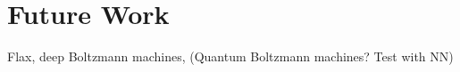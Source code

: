 \section{Future Work}\label{sec:Future}

Flax, deep Boltzmann machines, (Quantum Boltzmann machines? Test with NN)
